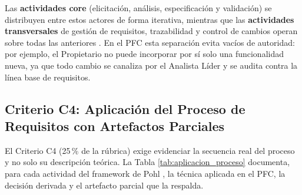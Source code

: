 Las \textbf{actividades core} (elicitación, análisis, especificación y validación) se distribuyen entre estos actores de forma iterativa, mientras que las \textbf{actividades transversales} de gestión de requisitos, trazabilidad y control de cambios operan sobre todas las anteriores \cite{ireb2023, pmbok}. En el PFC esta separación evita vacíos de autoridad: por ejemplo, el Propietario no puede incorporar por sí solo una funcionalidad nueva, ya que todo cambio se canaliza por el Analista Líder y se audita contra la línea base de requisitos.

\subsection{Criterio C4: Aplicación del Proceso de Requisitos con Artefactos Parciales}
El Criterio C4 (25\,\% de la rúbrica) exige evidenciar la secuencia real del proceso y no solo su descripción teórica. La Tabla \ref{tab:aplicacion_proceso} documenta, para cada actividad del framework de Pohl \cite{pohl2025}, la técnica aplicada en el PFC, la decisión derivada y el artefacto parcial que la respalda.

